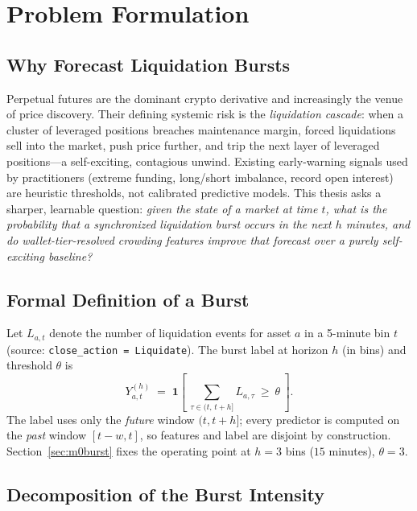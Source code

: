 \documentclass[11pt,a4paper]{article}
\begin{document}
\section{Problem Formulation}
\label{sec:formulation}

\subsection{Why Forecast Liquidation Bursts}

Perpetual futures are the dominant crypto derivative and increasingly the venue of price discovery. Their defining systemic risk is the \emph{liquidation cascade}: when a cluster of leveraged positions breaches maintenance margin, forced liquidations sell into the market, push price further, and trip the next layer of leveraged positions---a self-exciting, contagious unwind. Existing early-warning signals used by practitioners (extreme funding, long/short imbalance, record open interest) are heuristic thresholds, not calibrated predictive models. This thesis asks a sharper, learnable question: \emph{given the state of a market at time $t$, what is the probability that a synchronized liquidation burst occurs in the next $h$ minutes, and do wallet-tier-resolved crowding features improve that forecast over a purely self-exciting baseline?}

\subsection{Formal Definition of a Burst}

Let $L_{a,t}$ denote the number of liquidation events for asset $a$ in a 5-minute bin $t$ (source: \texttt{close\_action = Liquidate}). The burst label at horizon $h$ (in bins) and threshold $\theta$ is
\begin{equation}
Y^{(h)}_{a,t} \;=\; \mathbf{1}\!\left[\ \sum_{\tau \in (t,\,t+h]} L_{a,\tau}\ \ge\ \theta\ \right].
\label{eq:burst}
\end{equation}
The label uses only the \emph{future} window $(t, t+h]$; every predictor is computed on the \emph{past} window $[t-w, t]$, so features and label are disjoint by construction. Section~\ref{sec:m0burst} fixes the operating point at $h=3$ bins ($15$ minutes), $\theta=3$.

\subsection{Decomposition of the Burst Intensity}
\end{document}
